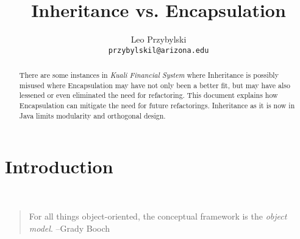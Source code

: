 \documentclass[12pt,notitlepage]{article}
\author{Leo Przybylski \\
\texttt{przybylskil@arizona.edu}}
\title{Inheritance vs. Encapsulation}
\begin{document}
  \maketitle
  \begin{abstract}
    There are some instances in \emph{Kuali Financial System} where Inheritance is possibly misused where Encapsulation may have not
    only been a better fit, but may have also lessened or even eliminated the need for refactoring. This document explains how Encapsulation
    can mitigate the need for future refactorings. Inheritance as it is now in Java limits modularity and orthogonal design.
  \end{abstract}
  
  \section{\hfill Introduction}
  \hrulefill
  \\
  \begin{quote}
  For all things object-oriented, the conceptual framework is the \emph{object model}. --Grady Booch ~\cite{gbone}
  \end{quote}
  
\end{document}
